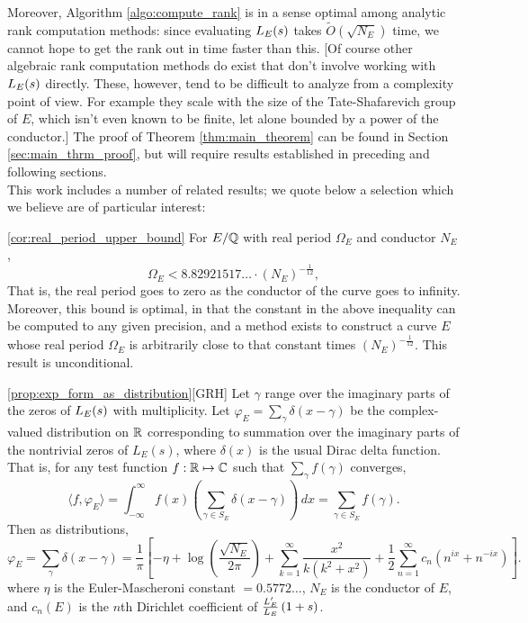Moreover, Algorithm \ref{algo:compute_rank} is in a sense optimal among analytic rank computation methods: since evaluating $L_E(s)$ takes $\tilde{O}(\sqrt{N_E})$ time, we cannot hope to get the rank out in time faster than this. [Of course other algebraic rank computation methods do exist that don't involve working with $L_E(s)$ directly. These, however, tend to be difficult to analyze from a complexity point of view. For example they scale with the size of the Tate-Shafarevich group of $E$, which isn't even known to be finite, let alone bounded by a power of the conductor.] The proof of Theorem \ref{thm:main_theorem} can be found in Section \ref{sec:main_thrm_proof}, but will require results established in preceding and following sections. \\

This work includes a number of related results; we quote below a selection which we believe are of particular interest:

\begin{quotedcorollary}{\ref{cor:real_period_upper_bound}}
For $E/\mathbb{Q}$ with real period $\Omega_E$ and conductor $N_E$,
\begin{equation}
\Omega_E < 8.82921517\ldots \cdot (N_E)^{-\frac{1}{12}},
\end{equation}
That is, the real period goes to zero as the conductor of the curve goes to infinity. Moreover, this bound is optimal, in that the constant in the above inequality can be computed to any given precision, and a method exists to construct a curve $E$ whose real period $\Omega_E$ is arbitrarily close to  that constant times $(N_E)^{-\frac{1}{12}}$.  This result is unconditional.
\end{quotedcorollary}

\begin{quotedtheorem}{\ref{prop:exp_form_as_distribution}}[GRH]
Let $\gamma$ range over the imaginary parts of the zeros of $L_E(s)$ with multiplicity. Let $\varphi_E = \sum_{\gamma} \delta(x-\gamma)$ be the complex-valued distribution on $\mathbb{R}$ corresponding to summation over the imaginary parts of the nontrivial zeros of $L_E(s)$, where $\delta(x)$ is the usual Dirac delta function. That is, for any test function $f: \mathbb{R} \mapsto \mathbb{C}$ such that $\sum_{\gamma}f(\gamma)$ converges, 
\begin{equation}
\langle f,\varphi_E \rangle = \int_{-\infty}^{\infty} f(x)\left(\sum_{\gamma\in S_E} \delta(x-\gamma)\right) \, dx = \sum_{\gamma\in S_E} f(\gamma).
\end{equation}
Then as distributions,
\begin{equation}\label{eqn:exp_form_3}
\varphi_E = \sum_{\gamma} \delta(x-\gamma) = \frac{1}{\pi}\left[-\eta + \log\left(\frac{\sqrt{N_E}}{2\pi}\right) +\sum_{k=1}^{\infty} \frac{x^2}{k(k^2+x^2)} + \frac{1}{2}\sum_{n=1}^{\infty} c_n \left(n^{ix}+n^{-ix}\right) \right].
\end{equation}
where $\eta$ is the Euler-Mascheroni constant $= 0.5772\ldots$, $N_E$ is the conductor of $E$, and $c_n(E)$ is the $n$th Dirichlet coefficient of $\frac{L_E^{\prime}}{L_E}\left(1+s\right)$.
\end{quotedtheorem}

